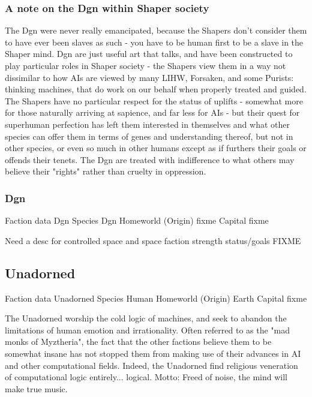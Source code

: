 \subsubsection{A note on the Dgn within Shaper society}
The Dgn were never really emancipated, because the Shapers don't
consider them to have ever been slaves as such - you have to be human
first to be a slave in the Shaper mind. Dgn are just useful art that
talks, and have been constructed to play particular roles in Shaper
society - the Shapers view them in a way not dissimilar to how AIs are
viewed by many LIHW, Forsaken, and some Purists: thinking machines,
that do work on our behalf when properly treated and guided. The
Shapers have no particular respect for the status of uplifts -
somewhat more for those naturally arriving at sapience, and far less
for AIs - but their quest for superhuman perfection has left them
interested in themselves and what other species can offer them in
terms of genes and understanding thereof, but not in other species, or
even so much in other humans except as if furthers their goals or
offends their tenets. The Dgn are treated with indifference to what
others may believe their "rights" rather than cruelty in oppression.

\subsubsection{Dgn}

Faction data 
Dgn 
Species 	Dgn 
Homeworld (Origin) 	fixme 
Capital 	fixme 

Need a desc for controlled space and space faction strength status/goals FIXME 

\subsection{Unadorned}

Faction data 
Unadorned 
Species 	Human 
Homeworld (Origin) 	Earth 
Capital 	fixme 

The Unadorned worship the cold logic of machines, and seek to abandon
the limitations of human emotion and irrationality. Often referred to
as the "mad monks of Myztheria", the fact that the other factions
believe them to be somewhat insane has not stopped them from making
use of their advances in AI and other computational fields. Indeed,
the Unadorned find religious veneration of computational logic
entirely... logical. Motto: Freed of noise, the mind will make true
music.
 
